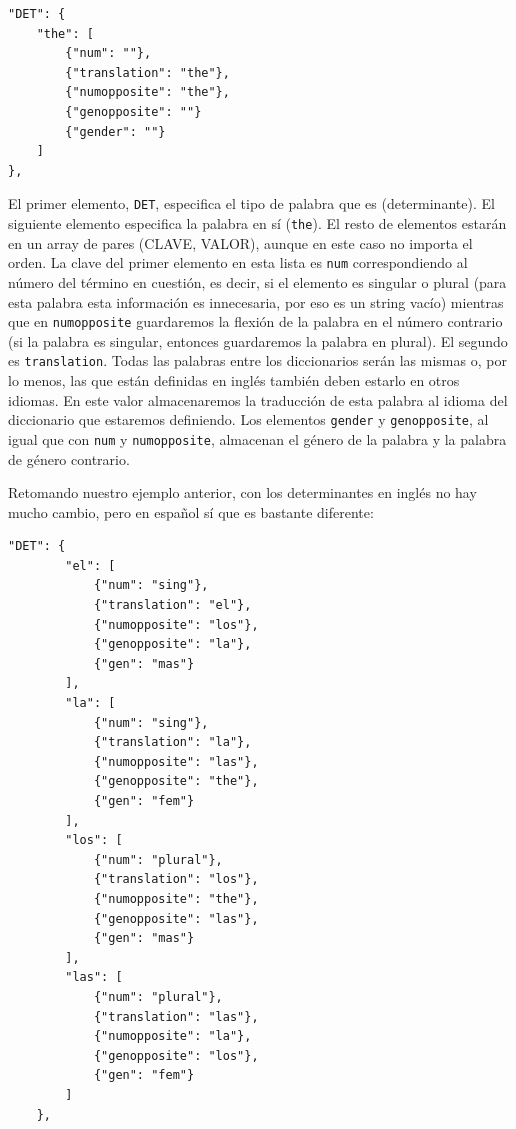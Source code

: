 \begin{lstlisting}[style=json]
"DET": {
    "the": [
        {"num": ""},
        {"translation": "the"},
        {"numopposite": "the"},
        {"genopposite": ""}
        {"gender": ""}
    ]
},
\end{lstlisting}

El primer elemento, \texttt{DET}, especifica el tipo de palabra que es (determinante). El siguiente elemento especifica la palabra en sí (\texttt{the}). El resto de elementos estarán en un array de pares (CLAVE, VALOR), aunque en este caso no importa el orden. La clave del primer elemento en esta lista es \texttt{num} correspondiendo al número del término en cuestión, es decir, si el elemento es singular o plural (para esta palabra esta información es innecesaria, por eso es un string vacío) mientras que en \texttt{numopposite} guardaremos la flexión de la palabra en el número contrario (si la palabra es singular, entonces guardaremos la palabra en plural).
El segundo es \texttt{translation}. Todas las palabras entre los diccionarios serán las mismas o, por lo menos, las que están definidas en inglés también deben estarlo en otros idiomas. En este valor almacenaremos la traducción de esta palabra al idioma del diccionario que estaremos definiendo.
Los elementos \texttt{gender} y \texttt{genopposite}, al igual que con \texttt{num} y \texttt{numopposite}, almacenan el género de la palabra y la palabra de género contrario.

Retomando nuestro ejemplo anterior, con los determinantes en inglés no hay mucho cambio, pero en español sí que es bastante diferente:

\begin{lstlisting}[style=json]
"DET": {
        "el": [
            {"num": "sing"},
            {"translation": "el"},
            {"numopposite": "los"},
            {"genopposite": "la"},
            {"gen": "mas"}
        ],
        "la": [
            {"num": "sing"},
            {"translation": "la"},
            {"numopposite": "las"},
            {"genopposite": "the"},
            {"gen": "fem"}
        ],
        "los": [
            {"num": "plural"},
            {"translation": "los"},
            {"numopposite": "the"},
            {"genopposite": "las"},
            {"gen": "mas"}
        ],
        "las": [
            {"num": "plural"},
            {"translation": "las"},
            {"numopposite": "la"},
            {"genopposite": "los"},
            {"gen": "fem"}
        ]
    },
\end{lstlisting}

